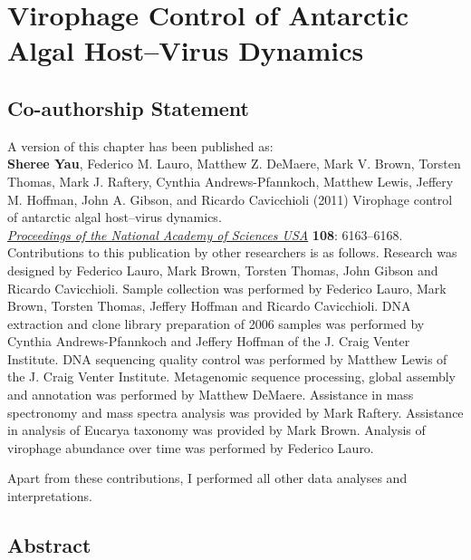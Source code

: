 \chapter{Virophage Control of Antarctic Algal Host--Virus Dynamics}
\label{ch:olv}

\section*{Co-authorship Statement}

A version of this chapter has been published as:\\

\textbf{Sheree Yau}, Federico M. Lauro, Matthew Z. DeMaere, Mark V. Brown, Torsten Thomas,
Mark J. Raftery, Cynthia Andrews-Pfannkoch, Matthew Lewis, Jeffery M. Hoffman, John A. Gibson, and
Ricardo Cavicchioli (2011)
Virophage control of antarctic algal host--virus dynamics.\\
\textit{\underline{Proceedings of the National Academy of Sciences USA}}
\textbf{108}: 6163--6168.\\

Contributions to this publication by other researchers is as follows.
Research was designed by Federico Lauro, Mark Brown, Torsten Thomas, John Gibson and Ricardo Cavicchioli.
Sample collection was performed by Federico Lauro, Mark Brown, Torsten Thomas, Jeffery Hoffman and Ricardo Cavicchioli.
DNA extraction and clone library preparation of 2006 samples was performed by Cynthia Andrews-Pfannkoch and Jeffery Hoffman of the J. Craig Venter Institute.
DNA sequencing quality control was performed by Matthew Lewis of the J. Craig Venter Institute.
Metagenomic sequence processing, global assembly and annotation was performed by Matthew DeMaere.
Assistance in mass spectronomy and mass spectra analysis was provided by Mark Raftery.
Assistance in analysis of Eucarya taxonomy was provided by Mark Brown.
Analysis of virophage abundance over time was performed by Federico Lauro.

Apart from these contributions, I performed all other data analyses and interpretations.
\newpage


\section{Abstract}

